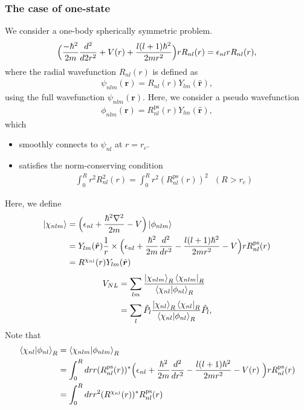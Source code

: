\documentclass{article}
\begin{document}
\subsubsection{The case of one-state}
We consider a one-body spherically symmetric problem.
\begin{align}
  \Bigl(
    \frac{-\hbar^2}{2m} \frac{d^2}{d2r^2}
    + V(r)
    + \frac{l(l+1)\hbar^2}{2mr^2} 
  \Bigr)r R_{nl}(r)
  = 
  \epsilon_{nl} r R_{nl}(r),
\end{align}
where the radial wavefunction $R_{nl}(r)$ is defined as 
\begin{align}
  \psi_{nlm}(\bm{r}) = R_{nl}(r) Y_{lm}(\hat{\bm{r}}),
\end{align}
using the full wavefunction $\psi_{nlm}(\bm{r})$.
Here, we consider a pseudo wavefunction 
\begin{align}
  \phi_{nlm}(\bm{r}) = R^{\text{ps}}_{nl}(r) Y_{lm}(\hat{\bm{r}}),
\end{align}
which 
\begin{itemize}
  \item smoothly connects to $\psi_{nl}$ at $r = r_c$.
  \item satisfies the norm-conserving condition
  \begin{align}
    \int_0^{R} r^2 R_{nl}^2 (r) = \int_0^{R} r^2 ( R^{\text{ps}}_{nl} (r) )^2\text{\ \ }(R > r_c)
  \end{align}
\end{itemize}
Here, we define 
\begin{align}
  \ket{\chi_{nlm}} 
  &= \Bigl(\epsilon_{nl} + \frac{\hbar^2\nabla^2}{2m} - V \Bigr)\ket{\phi_{nlm}}
  \nonumber
  \\&=
  Y_{lm}(\hat{\bm{r}})
  \frac{1}{r}
  \times
  \Bigl(\epsilon_{nl} + \frac{\hbar^2}{2m} \frac{d^2}{dr^2} - \frac{l(l+1)\hbar^2}{2mr^2} - V \Bigr) r R^{\text{ps}}_{nl}(r)
  \nonumber
  \\&= 
  R^{\chi_{nl}}(r) Y_{lm}(\hat{\bm{r}})
\end{align}
\begin{align}
  V_{NL} 
  &= \sum_{lm} \frac{\ket{\chi_{nlm}}_R\bra{\chi_{nlm}}_R}{\braket{\chi_{nl} | \phi_{nl}}_R}
  \nonumber
  \\&=
  \sum_{l} \hat{P_l} \frac{\ket{\chi_{nl}}_R\bra{\chi_{nl}}_R}{\braket{\chi_{nl} | \phi_{nl}}_R} \hat{P_l},
\end{align}
Note that 
\begin{align}
  \braket{\chi_{nl} | \phi_{nl}}_R
  &= \braket{\chi_{nlm} | \phi_{nlm}}_R
  \nonumber
  \\&=
  \int_0^R dr r 
  (R^{\text{ps}}_{nl}(r))^* 
  \Bigl(
    \epsilon_{nl} 
    + \frac{\hbar^2}{2m}\frac{d^2}{dr^2} 
    - \frac{l(l+1)\hbar^2}{2mr^2} - V(r) \
  \Bigr) r R^{\text{ps}}_{nl}(r)
  \nonumber
  \\&=
  \int_0^R dr r^2 (R^{\chi_{nl}}(r) )^* R^{\text{ps}}_{nl}(r)
\end{align}
\end{document}
